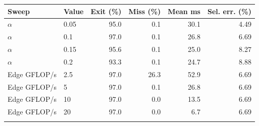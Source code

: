 \begin{tabular}{llrrrr}
\toprule
Sweep & Value & Exit (\%) & Miss (\%) & Mean ms & Sel. err. (\%) \\
\midrule
$\alpha$ & 0.05 & 95.0 & 0.1 & 30.1 & 4.49 \\
$\alpha$ & 0.1 & 97.0 & 0.1 & 26.8 & 6.69 \\
$\alpha$ & 0.15 & 95.6 & 0.1 & 25.0 & 8.27 \\
$\alpha$ & 0.2 & 93.3 & 0.1 & 24.7 & 8.88 \\
\addlinespace
Edge GFLOP/s & 2.5 & 97.0 & 26.3 & 52.9 & 6.69 \\
Edge GFLOP/s & 5 & 97.0 & 0.1 & 26.8 & 6.69 \\
Edge GFLOP/s & 10 & 97.0 & 0.0 & 13.5 & 6.69 \\
Edge GFLOP/s & 20 & 97.0 & 0.0 & 6.7 & 6.69 \\
\addlinespace
\bottomrule
\end{tabular}
